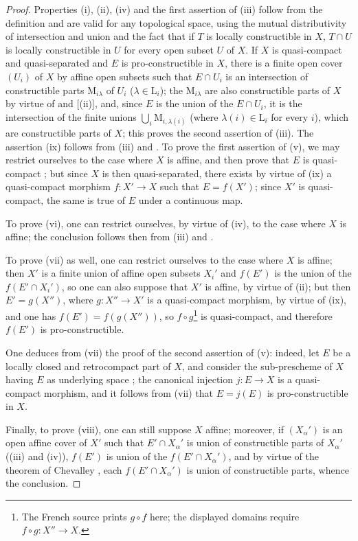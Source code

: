 \begin{proof}
Properties (i), (ii), (iv) and the first assertion of (iii) follow from the definition  and are valid for any topological space, using the mutual distributivity of intersection and union and the fact that if $T$ is locally constructible in $X$, $T\cap U$ is locally constructible in $U$ for every open subset $U$ of $X$.
If $X$ is quasi-compact and quasi-separated and $E$ is pro-constructible in $X$, there is a finite open cover $(U_i)$ of $X$ by affine open subsets such that $E\cap U_i$ is an intersection of constructible parts $\mathrm{M}_{i\lambda}$ of $U_i$ ($\lambda\in\mathrm{L}_i$); the $\mathrm{M}_{i\lambda}$ are also constructible parts of $X$ by virtue of  and [(ii)], and, since $E$ is the union of the $E\cap U_i$, it is the intersection of the finite unions $\bigcup_i \mathrm{M}_{i,\lambda(i)}$ (where $\lambda(i)\in\mathrm{L}_i$ for every $i$), which are constructible parts of $X$; this proves the second assertion of (iii).
The assertion (ix) follows from (iii) and .
To prove the first assertion of (v), we may restrict ourselves to the case where $X$ is affine, and then prove that $E$ is quasi-compact ; but since $X$ is then quasi-separated, there exists by virtue of (ix) a quasi-compact morphism $f:X'\to X$ such that $E=f(X')$; since $X'$ is quasi-compact, the same is true of $E$ under a continuous map.

To prove (vi), one can restrict ourselves, by virtue of (iv), to the case where $X$ is affine; the conclusion follows then from (iii) and .


To prove (vii) as well, one can restrict ourselves to the case where $X$ is affine; then $X'$ is a finite union of affine open subsets $X_i'$ and $f(E')$ is the union of the $f(E'\cap X_i')$, so one can also suppose that $X'$ is affine, by virtue of (ii); but then $E'=g(X'')$, where $g:X''\to X'$ is a quasi-compact morphism, by virtue of (ix), and one has $f(E')=f(g(X''))$, so $f\circ g$\footnote{The French source prints $g\circ f$ here; the displayed domains require $f\circ g:X''\to X$.} is quasi-compact, and therefore $f(E')$ is pro-constructible.

One deduces from (vii) the proof of the second assertion of (v): indeed, let $E$ be a locally closed and retrocompact part of $X$, and consider the sub-prescheme of $X$ having $E$ as underlying space ; the canonical injection $j:E\to X$ is a quasi-compact morphism, and it follows from (vii) that $E=j(E)$ is pro-constructible in $X$.

Finally, to prove (viii), one can still suppose $X$ affine; moreover, if $(X_\alpha')$ is an open affine cover of $X'$ such that $E'\cap X_\alpha'$ is union of constructible parts of $X_\alpha'$ ((iii) and (iv)), $f(E')$ is union of the $f(E'\cap X_\alpha')$, and by virtue of the theorem of Chevalley , each $f(E'\cap X_\alpha')$ is union of constructible parts, whence the conclusion.
\end{proof}

